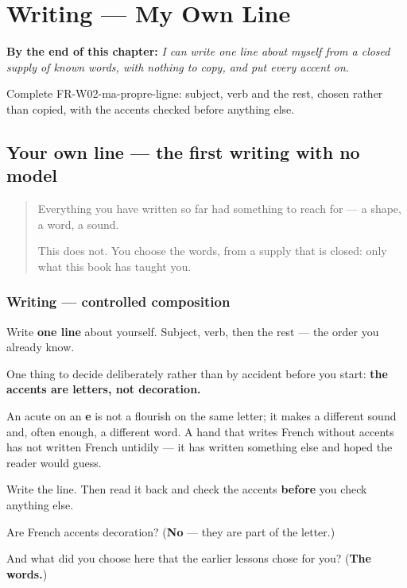 
\chapter{Writing --- My Own Line}
\label{ch:fr-ma-propre-ligne}

\begin{chapteropening}
\textbf{By the end of this chapter:} \emph{I can write one line about myself from a closed supply of known words, with nothing to copy, and put every accent on.}

Complete FR-W02-ma-propre-ligne: subject, verb and the rest, chosen rather than copied, with the accents checked before anything else.
\end{chapteropening}

\section[(ma propre ligne)]{Your own line — the first writing with no model}

\label{lesson:FR-W02-ma-propre-ligne}



\begin{quote}
Everything you have written so far had something to reach for — a shape, a word, a sound.

This does not. You choose the words, from a supply that is closed: only what this book has taught you.
\end{quote}

\subsection*{Writing — controlled composition}
Write \textbf{one line} about yourself. Subject, verb, then the rest — the order you already know.

One thing to decide deliberately rather than by accident before you start: \textbf{the accents are letters, not decoration.}

An acute on an \textbf{e} is not a flourish on the same letter; it makes a different sound and, often enough, a different word. A hand that writes French without accents has not written French untidily — it has written something else and hoped the reader would guess.

Write the line. Then read it back and check the accents \textbf{before} you check anything else.

\begin{tcolorbox}[breakable,colback=teal!4,colframe=teal!35!black,title={Before you move on}]
Are French accents decoration? (\textbf{No} — they are part of the letter.)

And what did you choose here that the earlier lessons chose for you? (\textbf{The words.})
\end{tcolorbox}
